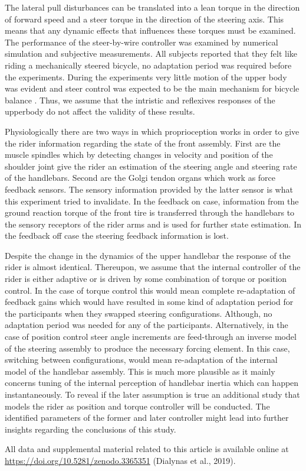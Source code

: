 The lateral pull disturbances can be translated into a lean torque in the direction of forward speed and a steer torque in the direction of the steering axis. This means that any dynamic effects that influences these torques must be examined. The performance of the steer-by-wire controller was examined by numerical simulation and subjective measurements. All subjects reported that they felt like riding a mechanically steered bicycle, no adaptation period was required before the experiments. During the experiments very little motion of the upper body was evident and steer control was expected to be the main mechanism for bicycle balance \cite{moore2011rider}. Thus, we assume that the intristic and reflexives responses of the upperbody do not affect the validity of these results.

Physiologically there are two ways in which proprioception works in order to give the rider information regarding the state of the front assembly. First are the muscle spindles which by detecting changes in velocity and position of the shoulder joint give the rider an estimation of the steering angle and steering rate of the handlebars. Second are the Golgi tendon organs which work as force feedback sensors. The sensory information provided by the latter sensor is what this experiment tried to invalidate. In the feedback on case, information from the ground reaction torque of the front tire is transferred through the handlebars to the sensory receptors of the rider arms and is used for further state estimation. In the feedback off case the steering feedback information is lost. 

Despite the change in the dynamics of the upper handlebar the response of the rider is almost identical. Thereupon, we assume that the internal controller of the rider is either adaptive or is driven by some combination of torque or position control. In the case of torque control this would mean complete re-adaptation of feedback gains which would have resulted in some kind of adaptation period for the  participants when they swapped steering configurations. Although, no adaptation period was needed for any of the participants. Alternatively, in the case of position control steer angle increments are feed-through an inverse model of the steering assembly to produce the necessary forcing element. In this case, switching between configurations, would mean re-adaptation of the internal model of the handlebar assembly. This is much more plausible as it mainly concerns tuning of the internal perception of handlebar inertia which can happen instantaneously. To reveal if the later assumption is true an additional study  that models the rider as position and torque controller will be conducted. The identified parameters of the former and later controller might lead into further insights regarding the conclusions of this study. 

\newpage



\vfill{All data and supplemental material related to this article is available online at \url{https://doi.org/10.5281/zenodo.3365351} (Dialynas et al., 2019)}. 



  





